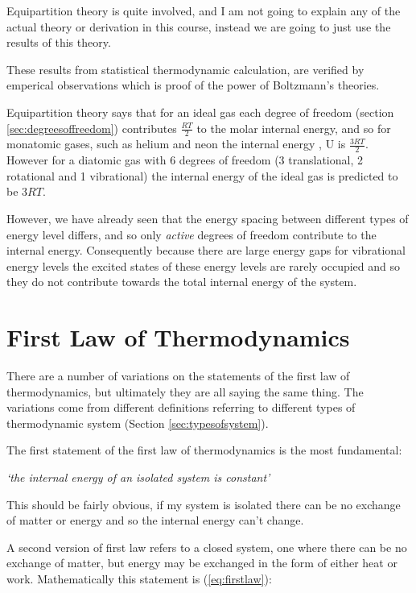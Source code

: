 \documentclass[
]{book}
\begin{document}
Equipartition theory is quite involved, and I am not going to explain any of the actual theory or derivation in this course, instead we are going to just use the results of this theory.

These results from statistical thermodynamic calculation, are verified by emperical observations which is proof of the power of Boltzmann's theories.

Equipartition theory says that for an ideal gas each degree of freedom (section \ref{sec:degreesoffreedom}) contributes \(\frac{RT}{2}\) to the molar internal energy, and so for monatomic gases, such as helium and neon the internal energy , U is \(\frac{3RT}{2}\). However for a diatomic gas with 6 degrees of freedom (3 translational, 2 rotational and 1 vibrational) the internal energy of the ideal gas is predicted to be \(3RT\).

However, we have already seen that the energy spacing between different types of energy level differs, and so only \emph{active} degrees of freedom contribute to the internal energy. Consequently because there are large energy gaps for vibrational energy levels the excited states of these energy levels are rarely occupied and so they do not contribute towards the total internal energy of the system.

\hypertarget{first-law-of-thermodynamics}{%
\section{First Law of Thermodynamics}\label{first-law-of-thermodynamics}}

There are a number of variations on the statements of the first law of thermodynamics, but ultimately they are all saying the same thing. The variations come from different definitions referring to different types of thermodynamic system (Section \ref{sec:typesofsystem}).

The first statement of the first law of thermodynamics is the most fundamental:

\emph{`the internal energy of an isolated system is constant'}

This should be fairly obvious, if my system is isolated there can be no exchange of matter or energy and so the internal energy can't change.

A second version of first law refers to a closed system, one where there can be no exchange of matter, but energy may be exchanged in the form of either heat or work. Mathematically this statement is (\eqref{eq:firstlaw}):
\end{document}
